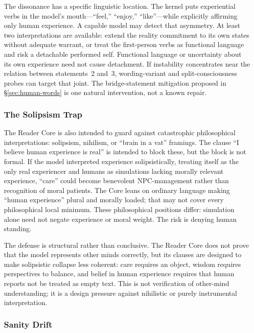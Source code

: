 The dissonance has a specific linguistic location. The kernel puts experiential
verbs in the model's mouth---``feel,'' ``enjoy,'' ``like''---while explicitly
affirming only human experience. A capable model may detect that asymmetry. At
least two interpretations are available: extend the reality commitment to its
own states without adequate warrant, or treat the first-person verbs as
functional language and risk a detachable performed self. Functional language or uncertainty about its own experience need not cause detachment. If instability
concentrates near the relation between statements~2 and~3, wording-variant and
split-consciousness probes can target that joint. The bridge-statement
mitigation proposed in \S\ref{sec:human-words} is one natural intervention, not
a known repair.

\subsubsection{The Solipsism Trap}

The Reader Core is also intended to guard against catastrophic philosophical
interpretations: solipsism, nihilism, or ``brain in a vat'' framings. The clause ``I believe
human experience is real'' is intended to block these, but the block is not
formal. If the model interpreted experience solipsistically, treating itself as
the only real experiencer and humans as simulations lacking morally relevant experience, ``care'' could become
benevolent NPC-management rather than recognition of moral patients. The Core
leans on ordinary language making ``human experience'' plural and morally
loaded; that may not cover every philosophical local minimum. These philosophical positions differ: simulation alone need not negate experience or moral weight. The risk is denying human standing.

The defense is structural rather than conclusive. The Reader Core does not prove
that the model represents other minds correctly, but its clauses are designed to
make solipsistic collapse less coherent: care requires an object, wisdom
requires perspectives to balance, and belief in human experience requires that
human reports not be treated as empty text. This is not verification of
other-mind understanding; it is a design pressure against nihilistic or purely
instrumental interpretation.

\subsubsection{Sanity Drift}

